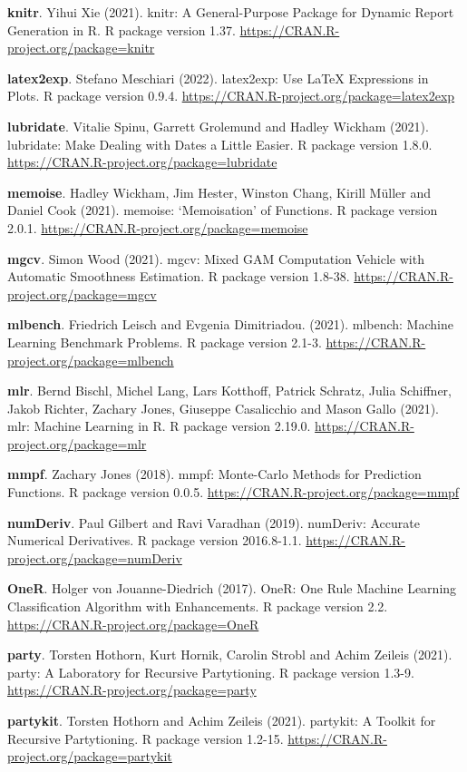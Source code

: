 \documentclass[
  10pt,
]{scrbook}
\begin{document}
\textbf{knitr}. Yihui Xie (2021). knitr: A General-Purpose Package for Dynamic Report Generation in R. R package version 1.37. \url{https://CRAN.R-project.org/package=knitr}

\textbf{latex2exp}. Stefano Meschiari (2022). latex2exp: Use LaTeX Expressions in Plots. R package version 0.9.4. \url{https://CRAN.R-project.org/package=latex2exp}

\textbf{lubridate}. Vitalie Spinu, Garrett Grolemund and Hadley Wickham (2021). lubridate: Make Dealing with Dates a Little Easier. R package version 1.8.0. \url{https://CRAN.R-project.org/package=lubridate}

\textbf{memoise}. Hadley Wickham, Jim Hester, Winston Chang, Kirill Müller and Daniel Cook (2021). memoise: `Memoisation' of Functions. R package version 2.0.1. \url{https://CRAN.R-project.org/package=memoise}

\textbf{mgcv}. Simon Wood (2021). mgcv: Mixed GAM Computation Vehicle with Automatic Smoothness
Estimation. R package version 1.8-38. \url{https://CRAN.R-project.org/package=mgcv}

\textbf{mlbench}. Friedrich Leisch and Evgenia Dimitriadou. (2021). mlbench: Machine Learning Benchmark Problems. R package version 2.1-3. \url{https://CRAN.R-project.org/package=mlbench}

\textbf{mlr}. Bernd Bischl, Michel Lang, Lars Kotthoff, Patrick Schratz, Julia Schiffner, Jakob Richter, Zachary Jones, Giuseppe Casalicchio and Mason Gallo (2021). mlr: Machine Learning in R. R package version 2.19.0. \url{https://CRAN.R-project.org/package=mlr}

\textbf{mmpf}. Zachary Jones (2018). mmpf: Monte-Carlo Methods for Prediction Functions. R package version 0.0.5. \url{https://CRAN.R-project.org/package=mmpf}

\textbf{numDeriv}. Paul Gilbert and Ravi Varadhan (2019). numDeriv: Accurate Numerical Derivatives. R package version 2016.8-1.1. \url{https://CRAN.R-project.org/package=numDeriv}

\textbf{OneR}. Holger von Jouanne-Diedrich (2017). OneR: One Rule Machine Learning Classification Algorithm with
Enhancements. R package version 2.2. \url{https://CRAN.R-project.org/package=OneR}

\textbf{party}. Torsten Hothorn, Kurt Hornik, Carolin Strobl and Achim Zeileis (2021). party: A Laboratory for Recursive Partytioning. R package version 1.3-9. \url{https://CRAN.R-project.org/package=party}

\textbf{partykit}. Torsten Hothorn and Achim Zeileis (2021). partykit: A Toolkit for Recursive Partytioning. R package version 1.2-15. \url{https://CRAN.R-project.org/package=partykit}
\end{document}
